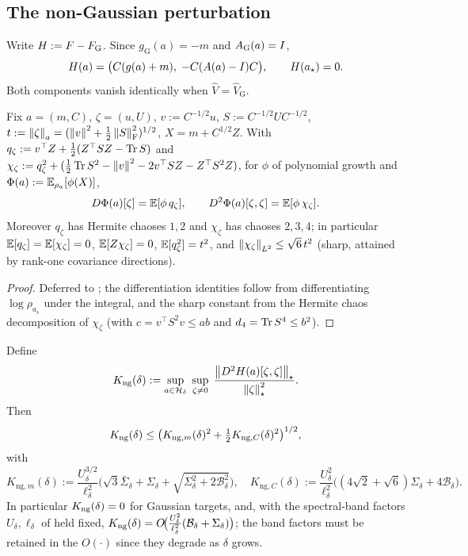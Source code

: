 \subsection{The non-Gaussian perturbation}

Write $H:=F-F_{\mathrm G}$. Since $g_{\mathrm G}(a)=-m$ and $A_{\mathrm G}(a)=I$,
\begin{equation}
\label{eq:H-def}
    H(a)=\bigl(C(g(a)+m),\;-C(A(a)-I)C\bigr),\qquad H(a_\star)=0 .
\end{equation}
Both components vanish identically when $\widehat V=\widehat V_{\mathrm G}$.

\begin{lemma}
\label{lem:second-score}
Fix $a=(m,C)$, $\zeta=(u,U)$, $v:=C^{-1/2}u$, $S:=C^{-1/2}UC^{-1/2}$,
$t:=\left\lVert \zeta\right\rVert_a=(\left\lVert v\right\rVert^2+\tfrac12\left\lVert S\right\rVert_{\mathrm{F}}^2)^{1/2}$, $X=m+C^{1/2}Z$. With
$q_\zeta:=v^\top Z+\tfrac12(Z^\top SZ-\operatorname{Tr} S)$ and
$\chi_\zeta:=q_\zeta^2+(\tfrac12\operatorname{Tr} S^2-\left\lVert v\right\rVert^2-2v^\top SZ-Z^\top S^2Z)$, for $\phi$ of polynomial
growth and $\Phi(a):=\mathbb{E}_{\rho_a}[\phi(X)]$,
\[
    D\Phi(a)[\zeta]=\mathbb{E}[\phi\,q_\zeta],
    \qquad
    D^2\Phi(a)[\zeta,\zeta]=\mathbb{E}[\phi\,\chi_\zeta].
\]
Moreover $q_\zeta$ has Hermite chaoses $1,2$ and $\chi_\zeta$ has chaoses $2,3,4$; in particular
$\mathbb{E}[q_\zeta]=\mathbb{E}[\chi_\zeta]=0$, $\mathbb{E}[Z\chi_\zeta]=0$, $\mathbb{E}[q_\zeta^2]=t^2$, and
$\left\lVert \chi_\zeta\right\rVert_{L^2}\leq\sqrt6\,t^2$ (sharp, attained by rank-one covariance directions).
\end{lemma}

\begin{proof}
Deferred to ; the differentiation identities follow from differentiating
$\log\rho_{a_s}$ under the integral, and the sharp constant from the Hermite chaos decomposition of
$\chi_\zeta$ (with $c=v^\top S^2v\leq ab$ and $d_4=\operatorname{Tr} S^4\leq b^2$).
\end{proof}

\begin{lemma}
\label{lem:Kng}
Define
\[
    K_{\mathrm{ng}}(\delta):=\sup_{a\in\mathcal{H}_\delta}\;\sup_{\zeta\neq0}\;\frac{\left\lVert D^2H(a)[\zeta,\zeta]\right\rVert_\star}{\left\lVert \zeta\right\rVert_\star^2}.
\]
Then
\[
    K_{\mathrm{ng}}(\delta)\leq\bigl(K_{\mathrm{ng},m}(\delta)^2+\tfrac12K_{\mathrm{ng},C}(\delta)^2\bigr)^{1/2},
\]
with
\[
    K_{\mathrm{ng},m}(\delta):=\frac{U_\delta^{3/2}}{\ell_\delta^2}\bigl(\sqrt3\bar\Sigma_\delta+\Sigma_\delta+\sqrt{\Sigma_\delta^2+2\mathcal B_\delta^2}\bigr),
    \quad
    K_{\mathrm{ng},C}(\delta):=\frac{U_\delta^2}{\ell_\delta^2}\bigl((4\sqrt2+\sqrt6)\Sigma_\delta+4\mathcal B_\delta\bigr).
\]
In particular $K_{\mathrm{ng}}(\delta)=0$ for Gaussian targets, and, with the spectral-band factors
$U_\delta,\ell_\delta$ of  held fixed,
$K_{\mathrm{ng}}(\delta)=O\!\bigl(\tfrac{U_\delta^2}{\ell_\delta^2}(\mathcal B_\delta+\Sigma_\delta)\bigr)$; the
band factors must be retained in the $O(\cdot)$ since they degrade as $\delta$ grows.
\end{lemma}


